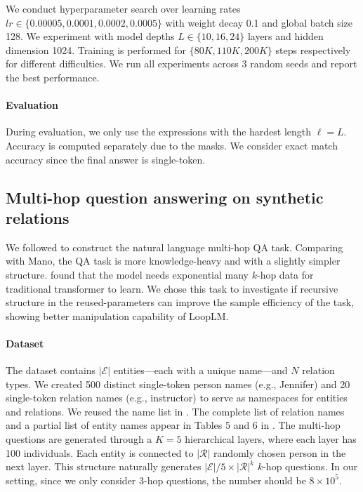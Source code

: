\documentclass[]{bytedance_seed}
\newcommand{\1}{\mathbf{1}}
\newcommand{\ut}{LoopLM}
\begin{document}
{We conduct hyperparameter search over learning rates $lr \in \{0.00005, 0.0001, 0.0002, 0.0005\}$
with weight decay 0.1 and global batch size 128. We experiment with model depths $L \in \{10, 16, 24\}$ layers and hidden dimension 1024. Training is performed for $\{80K, 110K, 200K\}
$ steps respectively for different difficulties. We run all experiments across 3 random seeds and report the best performance. 

\paragraph{Evaluation} During evaluation, we only use the expressions with the hardest length $\ell=L$. Accuracy is computed separately due to the masks. We consider exact match accuracy since the final answer is single-token.



\subsection{Multi-hop question answering on synthetic relations}
\label{appendix:multihop}
We followed \cite{yao2025language} to construct the natural language multi-hop QA task. Comparing with Mano, the QA task is more knowledge-heavy and with a slightly simpler structure. \cite{yao2025language} found that the model needs exponential many $k$-hop data for traditional transformer to learn. We chose this task to investigate if recursive structure in the reused-parameters can improve the sample efficiency of the task, showing better manipulation capability of \ut{}.

\paragraph{Dataset} The dataset contains 
$|\mathcal{E}|$ entities—each with a unique name—and 
$N$ relation types. We created 500 distinct single-token person names (e.g., Jennifer) and 20 single-token relation names (e.g., instructor) to serve as namespaces for entities and relations. We reused the name list in \cite{yao2025language}. The complete list of relation names and a partial list of entity names appear in Tables 5 and 6 in \cite{yao2025language}. The multi-hop questions are generated through a $K=5$ hierarchical layers, where each layer has 100 individuals. Each entity is connected to $|\mathcal{R}|$ randomly chosen person in the next layer. This structure naturally generates $|\mathcal{E}|/5 \times |\mathcal{R}|^k$ $k$-hop questions. In our setting, since we only consider 3-hop questions, the number should be $8\times 10^5$.

}
\end{document}

